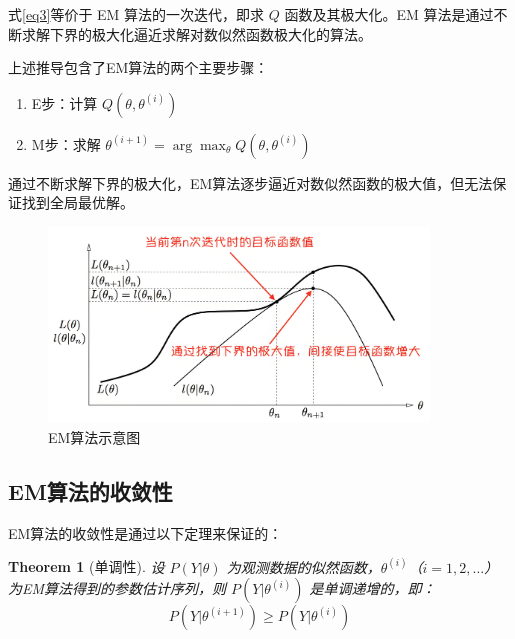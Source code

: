 \documentclass[a4paper,12pt]{ctexart} %
\newtheorem{theorem}{Theorem} %
\begin{document}
式\eqref{eq3}等价于 EM 算法的一次迭代，即求 \( Q \) 函数及其极大化。EM 算法是通过不断求解下界的极大化逼近求解对数似然函数极大化的算法。


上述推导包含了EM算法的两个主要步骤：

\begin{enumerate}
    \item E步：计算 \( Q(\theta, \theta^{(i)}) \)
    \item M步：求解 \( \theta^{(i+1)} = \arg \max_{\theta} Q(\theta, \theta^{(i)}) \)
\end{enumerate}

通过不断求解下界的极大化，EM算法逐步逼近对数似然函数的极大值，但无法保证找到全局最优解。
\begin{figure}[H]
    \centering
    \includegraphics[width=0.9\textwidth]{fig/EM算法示意图.jpg}
    \caption{EM算法示意图}
\end{figure}
\subsection{EM算法的收敛性}

EM算法的收敛性是通过以下定理来保证的：

\begin{theorem}[单调性]
设 \( P(Y|\theta) \) 为观测数据的似然函数，\( \theta^{(i)} \)（\( i = 1, 2, \dots \)）为EM算法得到的参数估计序列，则 \( P(Y|\theta^{(i)}) \) 是单调递增的，即：
\begin{equation}
P(Y|\theta^{(i+1)}) \geq P(Y|\theta^{(i)})
\label{eq:monotonicity}
\end{equation}
\end{theorem}
\end{document}

